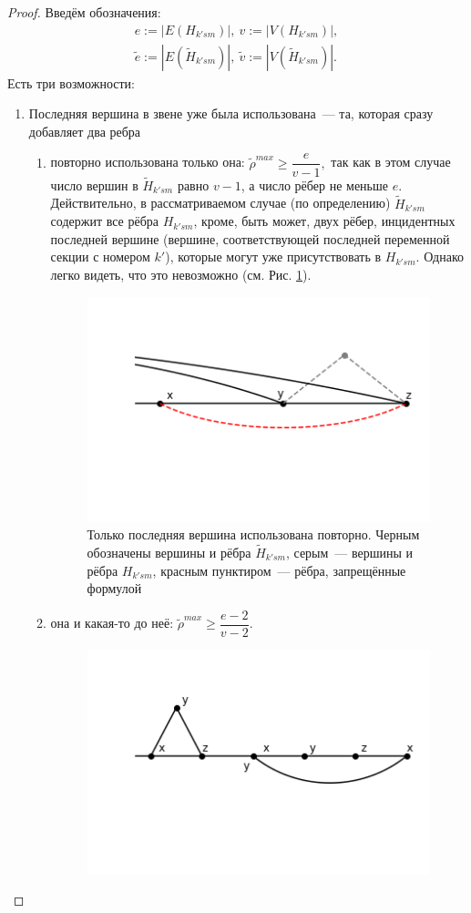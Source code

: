 \begin{proof}
Введём обозначения:
\begin{equation*}
\begin{split}
e:= |E(H_{k'sm})|,~ v:= |V(H_{k'sm})|,\\
\tilde e:= |E(\tilde H_{k'sm})|,~ \tilde v:= |V(\tilde H_{k'sm})|.
\end{split}
\end{equation*}
Есть три возможности:
\begin{enumerate}
\item 
Последняя вершина в звене уже была использована~--- та, которая сразу добавляет два ребра
\begin{enumerate}
\item 
повторно использована только она: $\tilde \rho^{max} \geq \dfrac{e}{v-1},$ 
так как в этом случае число вершин в $\tilde H_{k'sm}$ равно $v-1$, а число рёбер не меньше $e$. Действительно, в рассматриваемом случае (по определению) $\tilde H_{k'sm}$ содержит все рёбра $H_{k'sm}$, кроме, быть может, двух рёбер, инцидентных последней вершине (вершине, соответствующей последней переменной секции с номером $k'$), которые могут уже присутствовать в $H_{k'sm}$.
Однако легко видеть, что это невозможно (см. Рис. \ref{fig:only last reused}).
\begin{figure}
  \centering
  \includegraphics[scale=0.5]{picrel/only_last_reused.png}
  \caption{Только последняя вершина использована повторно. Черным обозначены вершины и рёбра $\tilde H_{k'sm}$, серым~--- вершины и рёбра  $H_{k'sm}$, красным пунктиром~--- рёбра, запрещённые формулой  }
  \label{fig:only last reused}
\end{figure}
\item
она и какая-то до неё: $\tilde \rho^{max} \geq \dfrac{e-2}{v-2}.$ 
\begin{figure}
  \centering
  \includegraphics[scale=0.5]{picrel/reuse_intermediate.png}

\end{figure}
\end{enumerate}
\end{enumerate}
\end{proof}
